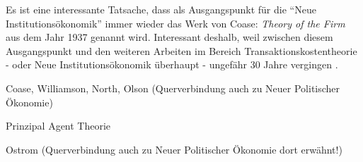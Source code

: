 Es ist eine interessante Tatsache, dass als Ausgangspunkt für die "`Neue Institutionsökonomik"' immer wieder das Werk von Coase: \textit{Theory of the Firm} aus dem Jahr 1937 genannt wird. Interessant deshalb, weil zwischen diesem Ausgangspunkt und den weiteren Arbeiten im Bereich Transaktionskostentheorie -  oder Neue Institutionsökonomik überhaupt - ungefähr 30 Jahre vergingen \parencite[S. 148]{Blaug2001}.

Coase, Williamson, North, Olson (Querverbindung auch zu Neuer Politischer Ökonomie)

Prinzipal Agent Theorie


Ostrom (Querverbindung auch zu Neuer Politischer Ökonomie dort erwähnt!)



